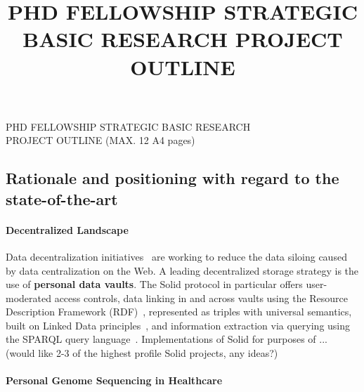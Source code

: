 \documentclass[a4paper,11pt]{article}
\begin{document}
\begin{mdframed}[backgroundcolor=black!17,linecolor=black!0,font=\bfseries]
	\centering
	PHD FELLOWSHIP STRATEGIC BASIC RESEARCH\\
	PROJECT OUTLINE (MAX. 12 A4 pages)\\
	\end{mdframed}
	\vspace{-.5\baselineskip}
\title{PHD FELLOWSHIP STRATEGIC BASIC RESEARCH PROJECT OUTLINE}

\begin{refsection}

\section{Rationale and positioning with regard to the state-of-the-art}

\smallskip

\paragraph{Decentralized Landscape}
Data decentralization initiatives~\cite{solid, mastodon, decentralizednanopubs} are working to reduce the data siloing caused by data centralization on the Web.
A leading decentralized storage strategy is the use of \textbf{personal data vaults}.
The Solid protocol in particular offers user-moderated access controls, data linking in and across vaults using the Resource Description Framework (RDF)~\cite{spec:rdf}, represented as triples with universal semantics, built on Linked Data principles~\cite{linkeddata}, and information extraction via querying using the SPARQL query language~\cite{spec:sparqllang}.
Implementations of Solid for purposes of ... (would like 2-3 of the highest profile Solid projects, any ideas?)


\paragraph{Personal Genome Sequencing in Healthcare}


\end{refsection}
\end{document}
